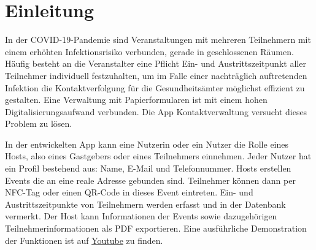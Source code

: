 \sloppy
\section{Einleitung}
\label{sec:Einleitung}
In der COVID-19-Pandemie sind Veranstaltungen mit mehreren Teilnehmern mit einem erhöhten Infektionsrisiko verbunden, gerade in geschlossenen Räumen.
Häufig besteht an die Veranstalter eine Pflicht Ein- und Austrittszeitpunkt aller Teilnehmer individuell festzuhalten, um im Falle einer nachträglich auftretenden Infektion die Kontaktverfolgung für die Gesundheitsämter möglichst effizient zu gestalten.
Eine Verwaltung mit Papierformularen ist mit einem hohen Digitalisierungsaufwand verbunden.
Die App Kontaktverwaltung versucht dieses Problem zu lösen.

In der entwickelten App kann eine Nutzerin oder ein Nutzer die Rolle eines Hosts, also eines Gastgebers oder eines Teilnehmers einnehmen.
Jeder Nutzer hat ein Profil bestehend aus: Name, E-Mail und Telefonnummer.
Hosts erstellen Events die an eine reale Adresse gebunden sind. Teilnehmer können dann per NFC-Tag oder einen QR-Code in dieses Event eintreten. 
Ein- und Austrittszeitpunkte von Teilnehmern werden erfasst und in der Datenbank vermerkt.
Der Host kann Informationen der Events sowie dazugehörigen Teilnehmerinformationen als PDF exportieren.
Eine ausführliche Demonstration der Funktionen ist auf \href{https://www.youtube.com/watch?v=DpT3mvPvIes}{Youtube} zu finden.
